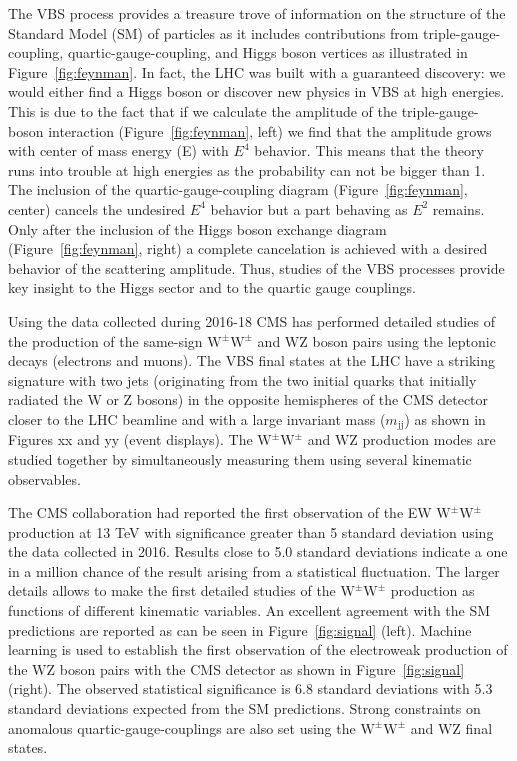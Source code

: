 \documentclass[12pt]{article}
\newcommand{\WZ}{\ensuremath{\mathrm{W}\mathrm{Z}}}
\newcommand{\WW}{\ensuremath{\mathrm{W}^\pm\mathrm{W}^\pm}}
\newcommand{\jet}{\ensuremath{\mathrm{j}}}
\newcommand{\mjj}{\ensuremath{m_{\jet\jet}}}
\begin{document}
The VBS process provides a treasure trove of information on the structure of the Standard Model (SM) of particles as it includes contributions from triple-gauge-coupling, quartic-gauge-coupling, and Higgs boson vertices as illustrated in Figure~\ref{fig:feynman}. In fact, the LHC was built with a guaranteed discovery: we would either find a Higgs boson or discover new physics in VBS at high energies. This is due to the fact that if we calculate the amplitude of the triple-gauge-boson interaction (Figure~\ref{fig:feynman}, left)  we find that the amplitude grows with center of mass energy (E) with $E^4$ behavior. This means that the theory runs into trouble at high energies as the probability can not be bigger than 1. The inclusion of the quartic-gauge-coupling diagram (Figure~\ref{fig:feynman}, center) cancels the undesired $E^4$ behavior but a part behaving as $E^2$ remains. Only after the inclusion of the Higgs boson exchange diagram (Figure~\ref{fig:feynman}, right) a complete cancelation is achieved with a desired behavior of the scattering amplitude. Thus, studies of the VBS processes provide key insight to the Higgs sector and to the quartic gauge couplings. 

Using the data collected during 2016-18 CMS has performed detailed studies of the production of the same-sign $\WW$ and $\WZ$ boson pairs using the leptonic decays (electrons and muons). The VBS final states at the LHC have a striking signature  with two jets (originating from the two initial quarks that initially radiated the W or Z bosons) in the opposite hemispheres of the CMS detector closer to the LHC beamline and with a large invariant mass ($\mjj$) as shown in Figures xx and yy (event displays). The $\WW$ and $\WZ$ production modes are studied together by simultaneously measuring them using several kinematic observables.  

The CMS collaboration had reported the first observation of the EW  $\WW$ production at 13 TeV with significance greater than 5 standard deviation using the data collected in 2016. Results close to 5.0 standard deviations indicate a one in a million chance of the result arising from a statistical fluctuation.  The larger details allows to make the first detailed studies of the $\WW$ production as functions of different kinematic variables. An excellent agreement with the SM predictions are reported as can be seen in Figure~\ref{fig:signal} (left). Machine learning is used to establish the first observation of the electroweak production of the $\WZ$ boson pairs with the CMS detector as shown in Figure~\ref{fig:signal} (right).  The observed statistical significance is 6.8 standard deviations with 5.3 standard deviations expected from the SM predictions. Strong constraints on anomalous quartic-gauge-couplings are also set using the $\WW$ and $\WZ$ final states. 
\end{document}

